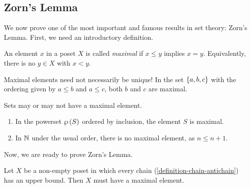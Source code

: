 \documentclass{article}
\begin{document}

\subsection{Zorn's Lemma}
\label{section-posets-zorns-lemma}

We now prove one of the most important and famous results in set theory: Zorn's Lemma. First, we need an introductory definition.

\begin{definition}
    An element $x$ in a poset $X$ is called \textit{maximal} if $x \leq y$ implies $x = y$. Equivalently, there is no $y \in X$ with $x < y$.
\end{definition}

\begin{note}
	Maximal elements need not necessarily be unique! In the set $\left\lbrace a, b, c \right\rbrace$ with the ordering given by $a \leq b$ and $a \leq c$, both $b$ and $c$ are maximal.
\end{note}

\begin{example}
	Sets may or may not have a maximal element.
    \begin{enumerate}
    	\item In the powerset $\wp\left(S\right)$ ordered by inclusion, the element $S$ is maximal.
    	\item In $\mathbb{N}$ under the usual order, there is no maximal element, as $n \leq n+1$.
	\end{enumerate}
\end{example}

Now, we are ready to prove Zorn's Lemma.

\begin{theorem}
	\label{zorns-lemma}
    Let $X$ be a non-empty poset in which every chain (\ref{definition-chain-antichain}) has an upper bound. Then $X$ must have a maximal element.
\end{theorem}
\end{document}
